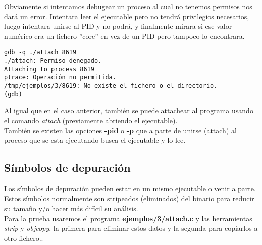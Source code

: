 Obviamente si intentamos debugear un proceso al cual no tenemos permisos nos dará un error. Intentara leer el ejecutable pero no tendrá privilegios necesarios, luego intentara unirse al PID y no podrá, y finalmente mirara si ese valor numérico era un fichero ''core'' en vez de un PID pero tampoco lo encontrara. 
\begin{verbatim}
gdb -q ./attach 8619
./attach: Permiso denegado.
Attaching to process 8619
ptrace: Operación no permitida.
/tmp/ejemplos/3/8619: No existe el fichero o el directorio.
(gdb)
\end{verbatim}

Al igual que en el caso anterior, también se puede attachear al programa usando el comando \emph{attach} (previamente abriendo el ejecutable).\\

También se existen las opciones \textbf{-pid} o \textbf{-p} que a parte de unirse (attach) al proceso que se esta ejecutando busca el ejecutable y lo lee.


\subsection{Símbolos de depuración}
Los símbolos de depuración pueden estar en un mismo ejecutable o venir a parte. Estos símbolos normalmente son stripeados (eliminados) del binario para reducir su tamaño y/o hacer más difícil su análisis. \\

Para la prueba usaremos el programa \textbf{ejemplos/3/attach.c} y las herramientas \emph{strip} y \emph{objcopy}, la primera para eliminar estos datos y la segunda para copiarlos a otro fichero..\\

